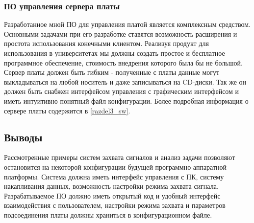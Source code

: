 \subsubsection{ПО управления сервера платы}
\label{razdel1_sw}
Разработанное мной ПО для управления платой является комплексным средством. Основными задачами при его разработке ставятся возможность
расширения и простота использования конечными клиентом. Реализуя продукт для использования в университетах мы должны создать
простое и бесплатное программное обеспечение, стоимость внедрения которого была бы не большой.
Сервер платы должен быть гибким - полученные с платы данные могут выкладываться на любой носитель и даже записываться на CD-диски.
Так же он должен быть снабжен интерфейсом управления с графическим интерфейсом и иметь интуитивно понятный файл конфигурации.
Более подробная информация о сервере платы содержится в \ref{razdel3_sw}.

\subsection{Выводы}
Рассмотренные примеры систем захвата сигналов и анализ задачи позволяют остановится на некоторой конфигурации будущей программно-аппаратной
платформы. Система должна иметь интерфейс управления с ПК, систему накапливания данных, возможность настройки режима захвата сигнала.
Разрабатываемое ПО должно иметь открытый код и удобный интерфейс взаимодействия с пользователем, настройки режима захвата и 
параметров подсоединения платы должны храниться в конфигурационном файле.

\newpage
